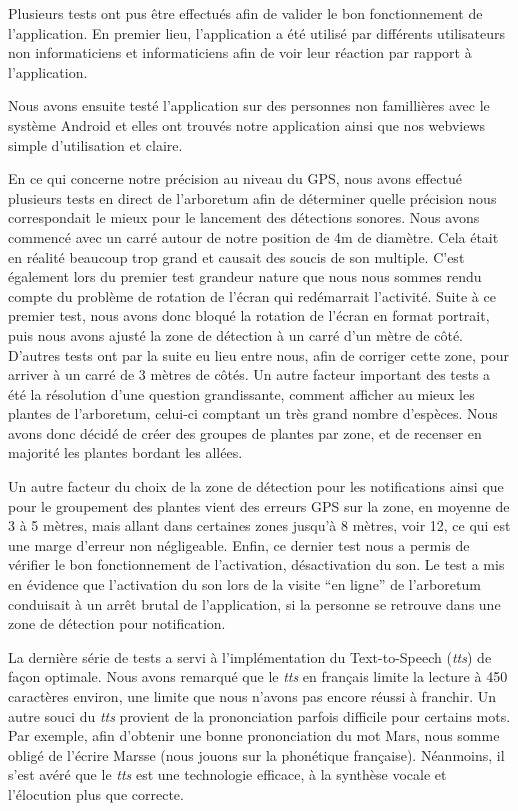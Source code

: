 \documentclass[a4paper,11pt]{article}
\begin{document}
		Plusieurs tests ont pus être effectués afin de valider le bon fonctionnement de l'application. En premier lieu, l'application a été utilisé par différents utilisateurs non informaticiens et informaticiens afin de voir leur réaction par rapport à l'application.

		Nous avons ensuite testé l'application sur des personnes non famillières avec le système Android et elles ont trouvés notre application ainsi que nos webviews simple d'utilisation et claire.

		En ce qui concerne notre précision au niveau du GPS, nous avons effectué plusieurs tests en direct de l'arboretum afin de déterminer quelle précision nous correspondait le mieux pour le lancement des détections sonores. Nous avons commencé avec un carré autour de notre position de 4m de diamètre. Cela était en réalité beaucoup trop grand et causait des soucis de son multiple. C'est également lors du premier test grandeur nature que nous nous sommes rendu compte du problème de rotation de l'écran qui redémarrait l'activité. Suite à ce premier test, nous avons donc bloqué la rotation de l'écran en format portrait, puis nous avons ajusté la zone de détection à un carré d'un mètre de côté. D'autres tests ont par la suite eu lieu entre nous, afin de corriger cette zone, pour arriver à un carré de 3 mètres de côtés. Un autre facteur important des tests a été la résolution d'une question grandissante, comment afficher au mieux les plantes de l'arboretum, celui-ci comptant un très grand nombre d'espèces. Nous avons donc décidé de créer des groupes de plantes par zone, et de recenser en majorité les plantes bordant les allées. 
		
		Un autre facteur du choix de la zone de détection pour les notifications ainsi que pour le groupement des plantes vient des erreurs GPS sur la zone, en moyenne de 3 à 5 mètres, mais allant dans certaines zones jusqu'à 8 mètres, voir 12, ce qui est une marge d'erreur non négligeable. Enfin, ce dernier test nous a permis de vérifier le bon fonctionnement de l'activation, désactivation du son. Le test a mis en évidence que l'activation du son lors de la visite ``en ligne'' de l'arboretum conduisait à un arrêt brutal de l'application, si la personne se retrouve dans une zone de détection pour notification.
		
		La dernière série de tests a servi à l'implémentation du Text-to-Speech (\emph{tts}) de façon optimale. Nous avons remarqué que le \emph{tts} en français limite la lecture à 450 caractères environ, une limite que nous n'avons pas encore réussi à franchir. Un autre souci du \emph{tts} provient de la prononciation parfois difficile pour certains mots. Par exemple, afin d'obtenir une bonne prononciation du mot Mars, nous somme obligé de l'écrire Marsse (nous jouons sur la phonétique française). Néanmoins, il s'est avéré que le \emph{tts} est une technologie efficace, à la synthèse vocale et l’élocution plus que correcte.
		
\end{document}
